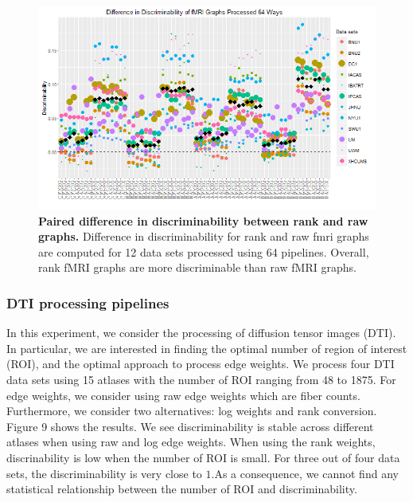 \documentclass{article}
\begin{document}
\begin{figure}[ht!]
	\includegraphics[width=\linewidth]{../Figs/64_pipelines_differ.png}
	\caption{{ \bf Paired difference in discriminability between rank and raw graphs.} Difference in discriminability for rank and raw fmri graphs are computed for 12 data sets processed using 64 pipelines. Overall, rank fMRI graphs are more discriminable than raw fMRI graphs.}
	\label{fig:7}
\end{figure}




\subsubsection{DTI processing pipelines}
In this experiment, we consider the processing of diffusion tensor images (DTI). In particular, we are interested in finding the optimal number of region of interest (ROI), and the optimal approach to process edge weights. We process four DTI data sets using 15 atlases with the number of ROI ranging from 48 to 1875. For edge weights, we consider using raw edge weights which are fiber counts. Furthermore, we consider two alternatives: log weights and rank conversion. Figure 9 shows the results. We see discriminability is stable across different atlases when using raw and log edge weights. When using the rank weights, discrinability is low when the number of ROI is small. For three out of four data sets, the discriminability is very close to $1$.As a consequence, we cannot find any statistical relationship between the number of ROI and discriminability.
\end{document}
